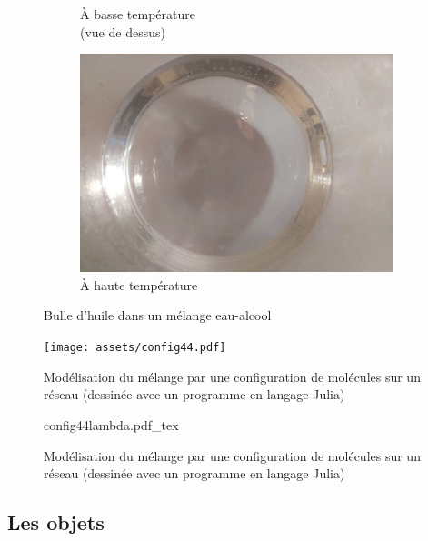 \documentclass[french]{beamer}
\begin{document}
\begin{frame}
\begin{figure}
\begin{subfigure}{0.32\textwidth}
			\caption{\`A basse température\\(vue de dessus)}
		\end{subfigure}
		\begin{subfigure}{0.32\textwidth}
			\centering
			\includegraphics[height=0.3\textheight]{assets/bulle/IMG_20180612_220259.jpg}
			\caption{\`A haute température\\\phantom{}}
		\end{subfigure}
        \caption{Bulle d'huile dans un mélange eau-alcool}
        \label{fig:miscibilite-bulle}
    \end{figure}
\end{frame}

\frame{\tableofcontents}

\begin{frame}
\begin{figure}
	\centering
	\texttt{[image: assets/config44.pdf]}
	\caption{Modélisation du mélange par une configuration de molécules sur un réseau (dessinée avec un programme en langage Julia)}
\end{figure}
\end{frame}

\begin{frame}
\begin{figure}
	\centering
	\def\svgwidth{1\textwidth}
	{config44lambda.pdf_tex}
	\caption{Modélisation du mélange par une configuration de molécules sur un réseau (dessinée avec un programme en langage Julia)}
\end{figure}
\end{frame}

\subsection{Les objets}
\end{document}
